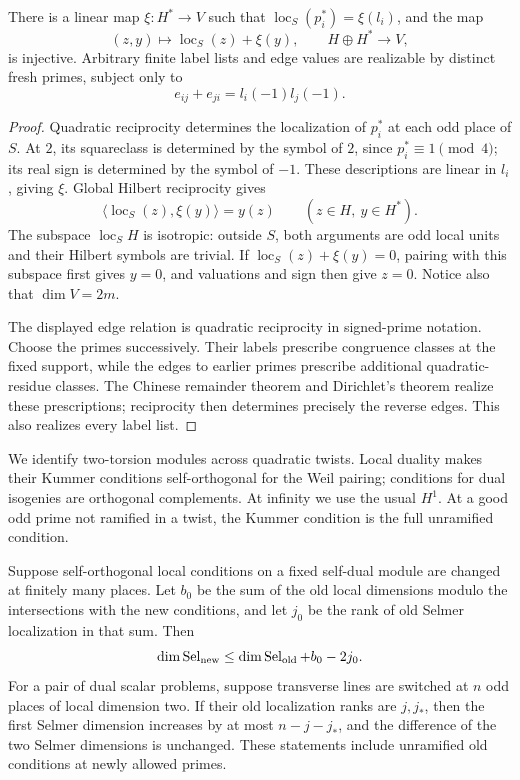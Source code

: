 \begin{lemma}\label{lem:reducible-labels}
There is a linear map \(\xi:H^*\to V\) such that
\(\operatorname{loc}_S(p_i^*)=\xi(l_i)\), and the map
\[
 (z,y)\longmapsto\operatorname{loc}_S(z)+\xi(y),
 \qquad H\oplus H^*\longrightarrow V,
\]
is injective.  Arbitrary finite label lists and edge values are realizable
by distinct fresh primes, subject only to
\[
 e_{ij}+e_{ji}=l_i(-1)l_j(-1).
\]
\end{lemma}

\begin{proof}
Quadratic reciprocity determines the localization of \(p_i^*\) at each
odd place of \(S\).  At \(2\), its squareclass is determined by the symbol
of \(2\), since \(p_i^*\equiv1\pmod4\); its real sign is determined by the
symbol of \(-1\).  These descriptions are linear in \(l_i\), giving
\(\xi\).  Global Hilbert reciprocity gives
\[
 \langle\operatorname{loc}_S(z),\xi(y)\rangle=y(z)
 \qquad(z\in H,\ y\in H^*).
\]
The subspace \(\operatorname{loc}_S H\) is isotropic: outside \(S\), both
arguments are odd local units and their Hilbert symbols are trivial.
If \(\operatorname{loc}_S(z)+\xi(y)=0\), pairing with this subspace first
gives \(y=0\), and valuations and sign then give \(z=0\).
Notice also that \(\dim V=2m\).

The displayed edge relation is quadratic reciprocity in signed-prime
notation.  Choose the primes successively.  Their labels prescribe
congruence classes at the fixed support, while the edges to earlier primes
prescribe additional quadratic-residue classes.  The Chinese remainder
theorem and Dirichlet's theorem realize these prescriptions; reciprocity
then determines precisely the reverse edges.  This also realizes every
label list.
\end{proof}

We identify two-torsion modules across quadratic twists.  Local duality
makes their Kummer conditions self-orthogonal for the Weil pairing;
conditions for dual isogenies are orthogonal complements.  At infinity we
use the usual \(H^1\).  At a good odd prime not ramified in a twist, the
Kummer condition is the full unramified condition.

\begin{lemma}\label{lem:reducible-change}
Suppose self-orthogonal local conditions on a fixed self-dual module are
changed at finitely many places.  Let \(b_0\) be the sum of the old local
dimensions modulo the intersections with the new conditions, and let
\(j_0\) be the rank of old Selmer localization in that sum.  Then
\[
 \dim\operatorname{Sel}_{\rm new}
 \le\dim\operatorname{Sel}_{\rm old}+b_0-2j_0.
\]
For a pair of dual scalar problems, suppose transverse lines are switched
at \(n\) odd places of local dimension two.  If their old localization
ranks are \(j,j_*\), then the first Selmer dimension increases by at most
\(n-j-j_*\), and the difference of the two Selmer dimensions is unchanged.
These statements include unramified old conditions at newly allowed
primes.
\end{lemma}

